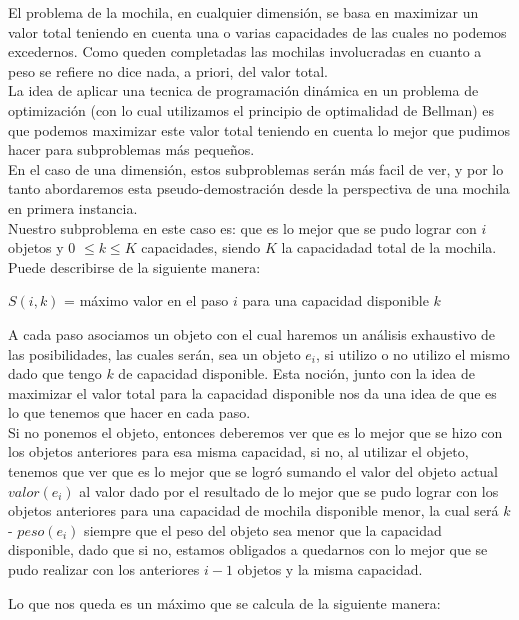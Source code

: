 El problema de la mochila, en cualquier dimensi\'on, se basa en maximizar un valor total teniendo en cuenta una o varias capacidades de las cuales no podemos excedernos. Como queden completadas las mochilas involucradas en cuanto a peso se refiere no dice nada, a priori, del valor total.\\

La idea de aplicar una tecnica de programación dinámica en un problema de optimización (con lo cual utilizamos el principio de optimalidad de Bellman) es que podemos maximizar este valor total teniendo en cuenta lo mejor que pudimos hacer para subproblemas m\'as pequeños.\\

En el caso de una dimensi\'on, estos subproblemas serán más facil de ver, y por lo tanto abordaremos esta pseudo-demostración desde la perspectiva de una mochila en primera instancia.\\

Nuestro subproblema en este caso es: que es lo mejor que se pudo lograr con $i$ objetos y 0 $\leq k \leq K$ capacidades, siendo $K$ la capacidadad total de la mochila.
Puede describirse de la siguiente manera:

\begin{center}
$S(i, k)$ = máximo valor en el paso $i$ para una capacidad disponible $k$
\end{center}

A cada paso asociamos un objeto con el cual haremos un análisis exhaustivo de las posibilidades, las cuales serán, sea un objeto $e_i$, si utilizo o no utilizo el mismo dado que tengo $k$ de capacidad disponible.
Esta noción, junto con la idea de maximizar el valor total para la capacidad disponible nos da una idea de que es lo que tenemos que hacer en cada paso. \\

Si no ponemos el objeto, entonces deberemos ver que es lo mejor que se hizo con los objetos anteriores para esa misma capacidad, si no, al utilizar el objeto, tenemos que ver que es lo mejor que se logró sumando el valor del objeto actual $valor(e_i)$ al valor dado por el resultado de lo mejor que se pudo lograr con los objetos anteriores para una capacidad de mochila disponible menor, la cual será $k$ - $peso(e_i)$ siempre que el peso del objeto sea menor que la capacidad disponible, dado que si no, estamos obligados a quedarnos con lo mejor que se pudo realizar con los anteriores $i-1$ objetos y la misma capacidad.

Lo que nos queda es un máximo que se calcula de la siguiente manera:

